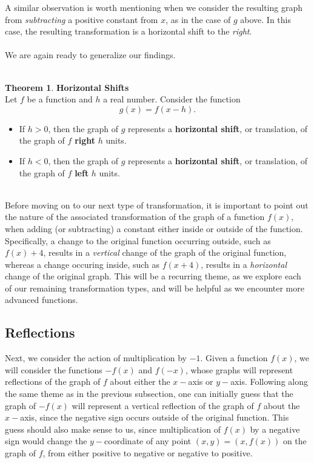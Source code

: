 \documentclass[11pt]{book}
\theoremstyle{definition}  %
\newtheorem{thm}{Theorem}[chapter] %
\newcommand{\bbm}{\begin{boxedminipage}{4.80in}} %
\newcommand{\ebm}{\end{boxedminipage}}
\begin{document}
A similar observation is worth mentioning when we consider the resulting graph from \textit{subtracting} a positive constant from $x$, as in the case of $g$ above.  In this case, the resulting transformation is a horizontal shift to the \textit{right}.\\
~\\
We are again ready to generalize our findings.\\
~\\
\smallskip
\bbm
\begin{thm} \label{hshifts}\textbf{Horizontal Shifts}\\
Let $f$ be a function and $h$ a real number.  Consider the function
$$g(x)=f(x-h).$$
\begin{itemize}
\item If $h>0$, then the graph of $g$ represents a \textbf{horizontal shift}, or translation, of the graph of $f$ \textbf{right} $h$ units.
\item If $h<0$, then the graph of $g$ represents a \textbf{horizontal shift}, or translation, of the graph of $f$ \textbf{left} $h$ units.
\end{itemize}
\end{thm}
\ebm

~\\

Before moving on to our next type of transformation, it is important to point out the nature of the associated transformation of the graph of a function $f(x)$, when adding (or subtracting) a constant either inside or outside of the function.  Specifically, a change to the original function occurring outside, such as $f(x)+4$, results in a \textit{vertical} change of the graph of the original function, whereas a change occuring inside, such as $f(x+4)$, results in a \textit{horizontal} change of the original graph.  This will be a recurring theme, as we explore each of our remaining transformation types, and will be helpful as we encounter more advanced functions.

\newpage

\subsection{Reflections}

Next, we consider the action of multiplication by $-1$.  Given a function $f(x)$, we will consider the functions $-f(x)$ and $f(-x)$, whose graphs will represent reflections of the graph of $f$ about either the $x-$axis or $y-$axis.  Following along the same theme as in the previous subsection, one can initially guess that the graph of $-f(x)$ will represent a vertical reflection of the graph of $f$ about the $x-$axis, since the negative sign occurs outside of the original function.  This guess should also make sense to us, since multiplication of $f(x)$ by a negative sign would change the $y-$coordinate of any point $(x,y)=(x,f(x))$ on the graph of $f$, from either positive to negative or negative to positive.
\end{document}

